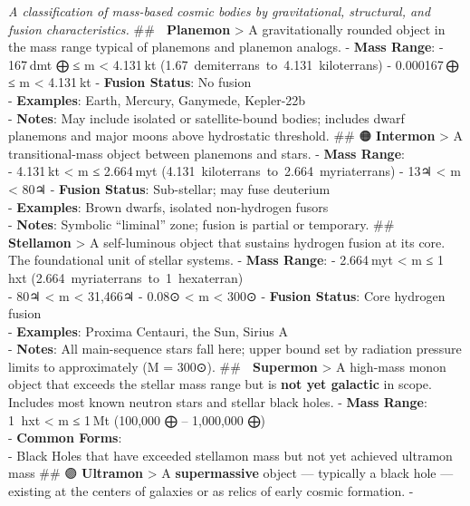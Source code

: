 \documentclass[
  letterpaper,
]{book}
\begin{document}
\emph{A classification of mass-based cosmic bodies by gravitational,
structural, and fusion characteristics.} \#\# 🔵 \textbf{Planemon}
\textgreater{} A gravitationally rounded object in the mass range
typical of planemons and planemon analogs. - \textbf{Mass Range}: -
167 dmt ⨁ ≤ m \textless{} 4.131 kt
(1.67~demiterrans~to~4.131~kiloterrans) - 0.000167 ⨁ ≤ m \textless{}
4.131 kt - \textbf{Fusion Status}: No fusion\\
- \textbf{Examples}: Earth, Mercury, Ganymede, Kepler-22b\\
- \textbf{Notes}: May include isolated or satellite-bound bodies;
includes dwarf planemons and major moons above hydrostatic threshold.
\#\# 🟠 \textbf{Intermon} \textgreater{} A transitional-mass object
between planemons and stars. - \textbf{Mass Range}:\\
- 4.131 kt \textless{} m ≤ 2.664 myt
(4.131~kiloterrans~to~2.664~myriaterrans) - 13♃ \textless{} m
\textless{} 80♃ - \textbf{Fusion Status}: Sub-stellar; may fuse
deuterium\\
- \textbf{Examples}: Brown dwarfs, isolated non-hydrogen fusors\\
- \textbf{Notes}: Symbolic ``liminal'' zone; fusion is partial or
temporary. \#\# 🔴 \textbf{Stellamon} \textgreater{} A self-luminous
object that sustains hydrogen fusion at its core. The foundational unit
of stellar systems. - \textbf{Mass Range}: - 2.664 myt \textless{} m ≤
1 hxt (2.664~myriaterrans~to~1~hexaterran)\\
- 80♃ \textless{} m \textless{} 31,466♃ - 0.08⊙ \textless{} m
\textless{} 300⊙ - \textbf{Fusion Status}: Core hydrogen fusion\\
- \textbf{Examples}: Proxima Centauri, the Sun, Sirius A\\
- \textbf{Notes}: All main-sequence stars fall here; upper bound set by
radiation pressure limits to approximately (M = 300⊙). \#\# 🔵
\textbf{Supermon} \textgreater{} A high-mass monon object that exceeds
the stellar mass range but is \textbf{not yet galactic} in scope.
Includes most known neutron stars and stellar black holes. -
\textbf{Mass Range}:\\
1  hxt \textless{} m ≤ 1 Mt (100,000 ⨁ -- 1,000,000 ⨁)\\
- \textbf{Common Forms}:\\
- Black Holes that have exceeded stellamon mass but not yet achieved
ultramon mass \#\# 🟣 \textbf{Ultramon} \textgreater{} A
\textbf{supermassive} object --- typically a black hole --- existing at
the centers of galaxies or as relics of early cosmic formation. -
\end{document}
